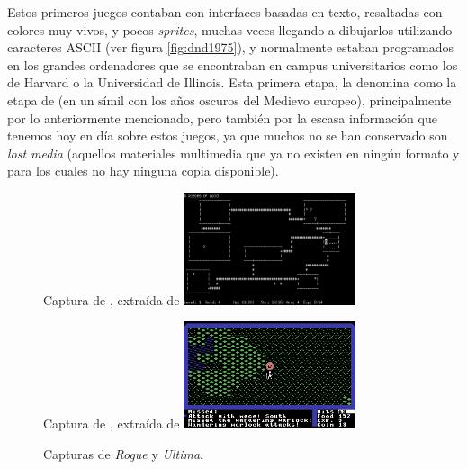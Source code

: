 \smallskip

Estos primeros juegos contaban con interfaces basadas en texto, resaltadas con colores muy vivos, y pocos \textit{sprites}, muchas veces llegando a dibujarlos utilizando caracteres ASCII (ver figura \ref{fig:dnd1975}), y normalmente estaban programados en los grandes ordenadores que se encontraban en campus universitarios como los de Harvard o la Universidad de Illinois. Esta primera etapa, \cite{barton2008dungeons} la denomina como la etapa de  (en un símil con los años oscuros del Medievo europeo), principalmente por lo anteriormente mencionado, pero también por la escasa información que tenemos hoy en día sobre estos juegos, ya que muchos no se han conservado son \textit{lost media} (aquellos materiales multimedia que ya no existen en ningún formato y para los cuales no hay ninguna copia disponible).

\smallskip

\begin{figure}[t]
\centering
\begin{SubFloat}
{\label{fig:rogue}%
	Captura de \cite{rogue}, extraída de \cite{rogueimg}}%
	\includegraphics[width=0.45\textwidth]{Imagenes/Bitmap/rogue}%
\end{SubFloat}
\qquad
\begin{SubFloat}
{\label{fig:ultima}%
	Captura de \cite{ultima}, extraída de \cite{ultimaimg}}%
	\includegraphics[width=0.45\textwidth]{Imagenes/Bitmap/ultima}%
\end{SubFloat}
\caption{Capturas de \textit{Rogue} y \textit{Ultima}. \label{fig:rogueultima}}
\end{figure}

